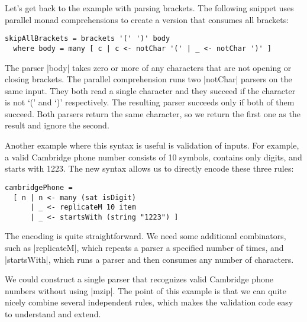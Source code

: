 \documentclass{tmr}
\newcommand{\authornote}[3]{}
\newcommand\bay[1]{\authornote{brent}{blue}{#1}}
\newcommand\tp[1]{\authornote{tomas}{red}{#1}}
\begin{document}
 \bay{Maybe just remove this sentence? Comparing tail1 and
  tail2 for equality seems like an obviously poor idea even if they
  were guaranteed to be finite.}
\tp{I made it a bit shorter, but I'd probably keep it - it was actually added in response to 
some feedback from others :-) }

Let's get back to the example with parsing brackets. The following snippet uses parallel 
monad comprehensions to create a version that consumes all brackets:

\begin{verbatim}
skipAllBrackets = brackets '(' ')' body
  where body = many [ c | c <- notChar '(' | _ <- notChar ')' ]
\end{verbatim}
The parser |body| takes zero or more of any characters that are not opening or closing brackets.
The parallel comprehension runs two |notChar| parsers on the same input. They both read a single
character and they succeed if the character is not `(' and `)' respectively. The resulting parser
succeeds only if both of them succeed. Both parsers return the same character, so we
return the first one as the result and ignore the second.

Another example where this syntax is useful is validation of
inputs. For example, a valid Cambridge
phone number consists of 10 symbols, contains only digits, and starts with 1223. The new
syntax allows us to directly encode these three rules:

\begin{verbatim}
cambridgePhone = 
  [ n | n <- many (sat isDigit)
      | _ <- replicateM 10 item
      | _ <- startsWith (string "1223") ]
\end{verbatim}
\bay{Why not use replicateM instead of times? If you aren't going to
  show the implementation of times anyway, it seems better to use a
  standard combinator.}
\tp{Of course, great suggestion!}
  
The encoding is quite straightforward. We need some additional
combinators, such as |replicateM|, which repeats a parser a specified
number of times, and |startsWith|, which runs a parser and then
consumes any number of characters.

We could construct a single parser that recognizes valid Cambridge phone numbers without using
|mzip|. The point of this example is that we can quite nicely combine several independent rules,
which makes the validation code easy to understand and extend.

\end{document}
